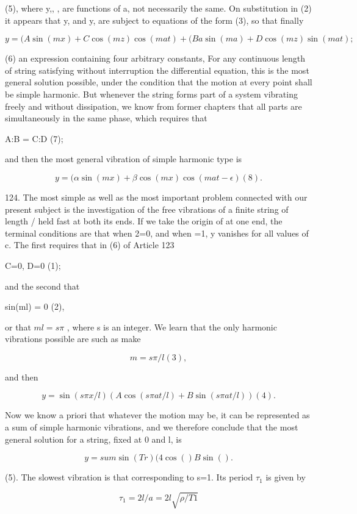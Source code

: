 (5), where y,, , are functions of a, not necessarily the same. On substitution
in (2) it appears that y, and y, are subject to equations of the form (3), so
that finally

\[y =(A \sin(mx) + C \cos(mz) \cos(mat) + (B a \sin(ma) + D \cos(mz) \sin(mat);\]

(6) an expression containing four arbitrary constants, For any continuous
length of string satisfying without interruption the differential equation,
this is the most general solution possible, under the condition that the motion
at every point shall be simple harmonic.  But whenever the string forms part of
a system vibrating freely and without dissipation, we know from former chapters
that all parts are simultaneously in the same phase, which requires that

A:B = C:D (7);

and then the most general vibration of simple harmonic type is

\[y = ( \alpha \sin(mx) + \beta \cos(mx) \cos(mat - \epsilon ) (8).\]

124. The most simple as well as the most important problem connected with our
present subject is the investigation of the free vibrations of a finite string
of length / held fast at both its ends. If we take the origin of at one end,
the terminal conditions are that when 2=0, and when =1, y vanishes for all
values of c. The first requires that in (6) of Article 123

C=0, D=0 (1);

and the second that

sin(ml) = 0 (2),

or that \(ml=s \pi\) , where s is an integer. We learn that the only harmonic
vibrations possible are such as make

\[m = s \pi /l (3),\]

and then

\[y = \sin(s \pi x/l)  (A \cos(s \pi a t /l) +  B \sin(s \pi a t/l)) (4).\]

Now we know a priori that whatever the motion may be, it can be represented as
a sum of simple harmonic vibrations, and we therefore conclude that the most
general solution for a string, fixed at 0 and l, is

\[y= sum \sin(Tr) (4 \cos() B \sin().\]

(5). The slowest vibration is that corresponding to s=1. Its period \(\tau_1\)
is given by

\[\tau_1 =  2 l/a = 2 l \sqrt{ \rho / T 1 }\]

